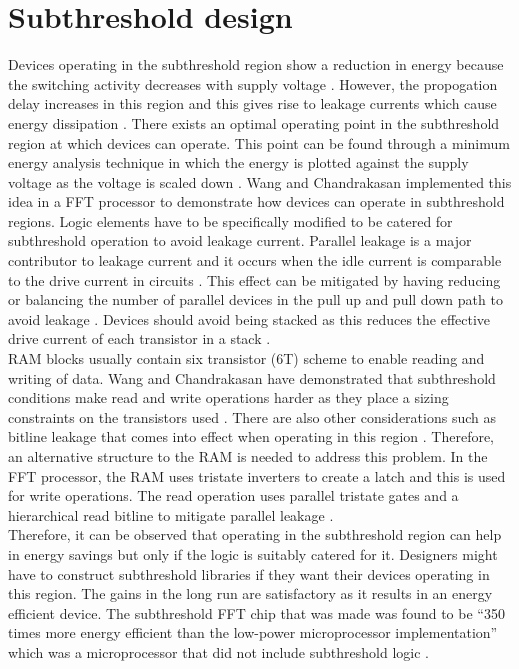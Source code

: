 \documentclass[journal]{IEEEtran}
\begin{document}
\section{Subthreshold design}
Devices operating in the subthreshold region show a reduction in energy because the switching activity decreases with supply voltage \cite{FFT}. However, the propogation delay increases in this region and this gives rise to leakage currents which cause energy dissipation \cite{FFT}. There exists an optimal operating point in the subthreshold region at which devices can operate. This point can be found through a minimum energy analysis technique in which the energy is plotted against the supply voltage as the voltage is scaled down \cite{FFT}. Wang and Chandrakasan \cite{FFT} implemented this idea in a FFT processor to demonstrate how devices can operate in subthreshold regions. Logic elements have to be specifically modified to be catered for subthreshold operation to avoid leakage current. Parallel leakage is a major contributor to leakage current and it occurs when the idle current is comparable to the drive current in circuits \cite{FFT}. This effect can be mitigated by having reducing or balancing the number of parallel devices in the pull up and pull down path to avoid leakage \cite{FFT}. Devices should avoid being stacked as this reduces the effective drive current of each transistor in a stack \cite{FFT}. \\

RAM blocks usually contain six transistor (6T) scheme to enable reading and writing of data. Wang and Chandrakasan have demonstrated that subthreshold conditions make read and write operations harder as they place a sizing constraints on the transistors used \cite{FFT}. There are also other considerations such as bitline leakage that comes into effect when operating in this region \cite{FFT}. Therefore, an alternative structure to the RAM is needed to address this problem. In the FFT processor, the RAM uses tristate inverters to create a latch and this is used for write operations. The read operation uses parallel tristate gates and a hierarchical read bitline to mitigate parallel leakage \cite{FFT}. \\

Therefore, it can be observed that operating in the subthreshold region can help in energy savings but only if the logic is suitably catered for it. Designers might have to construct subthreshold libraries if they want their devices operating in this region. The gains in the long run are satisfactory as it results in an energy efficient device.  The subthreshold FFT chip that was made was found to be ``350 times more energy efficient than the low-power microprocessor implementation'' which was a microprocessor that did not include subthreshold logic \cite{FFT}.
\end{document}
